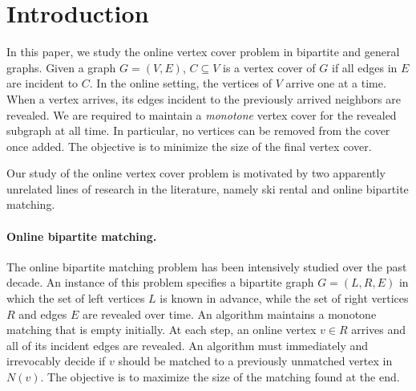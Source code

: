 \documentclass{article}
\begin{document}
\newtheorem{lemma}{Lemma}
\newtheorem{theorem}{Theorem}
\newtheorem{corollary}{Corollary}
\newtheorem{proposition}{Proposition}

\section{Introduction}

In this paper, we study the online vertex cover problem in bipartite and general graphs. Given a graph $G=(V,E)$, $C\subseteq V$ is a vertex cover of $G$ if all edges in $E$ are incident to $C$. In the online setting, the vertices of $V$ arrive one at a time. When a vertex arrives, its edges incident to the previously arrived neighbors are revealed. 
We are required to maintain a {\em monotone} vertex cover for the revealed subgraph at all time. In particular, no vertices can be removed from the cover once added. The objective is to minimize the size of the final vertex cover.

Our study of the online vertex cover problem is motivated by two apparently unrelated lines of research in the literature, namely ski rental and online bipartite matching. 

\paragraph{Online bipartite matching.}
The online bipartite matching problem has been intensively studied over the past decade. An instance of this problem specifies a bipartite graph $G=(L,R,E)$ in which the set of left vertices $L$ is known in advance, while the set of right vertices $R$ and edges $E$ are revealed over time. An algorithm maintains a monotone matching that is empty initially. At each step, an online vertex $v\in R$ arrives and all of its incident edges are revealed. An algorithm must immediately and irrevocably decide if $v$ should be matched to a previously unmatched vertex in $N(v)$. The objective is to maximize the size of the matching found at the end.
\end{document}
